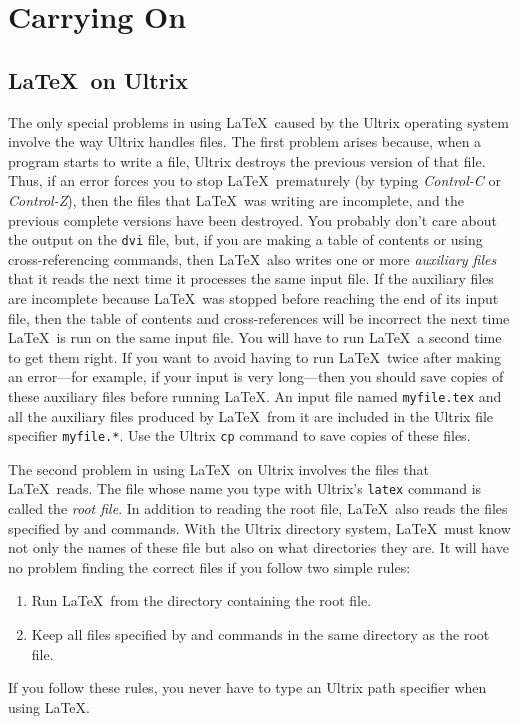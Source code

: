 \section{Carrying On}

\subsection{\LaTeX\ on Ultrix} \label{sec:op-system}

The only special problems in using \LaTeX\ caused by the Ultrix
operating system involve the way Ultrix handles files.  The first
problem arises because, when a program starts to write a file, Ultrix
destroys the previous version of that file.  Thus, if an error forces
you to stop \LaTeX\ prematurely (by typing {\em Control-C\/} or {\em
Control-Z\/}), then the files that \LaTeX\ was writing are incomplete,
and the previous complete versions have been destroyed.  You probably
don't care about the output on the {\tt dvi} file, but, if you are
making a table of contents or using cross-referencing commands, then
\LaTeX\ also writes one or more {\em auxiliary files\/} that it reads
the next time it processes the same input file.  If the auxiliary files
are incomplete because \LaTeX\ was stopped before reaching the end of
its input file, then the table of contents and cross-references will be
incorrect the next time \LaTeX\ is run on the same input file.  You
will have to run \LaTeX\ a second time to get them right.  If you want
to avoid having to run \LaTeX\ twice after making an error---for
example, if your input is very long---then you should save copies of
these auxiliary files before running \LaTeX. An input file named
\mbox{\tt myfile.tex} and all the auxiliary files produced by \LaTeX\
from it are included in the Ultrix file specifier \mbox{\tt myfile.*}.
Use the Ultrix {\tt cp} command to save copies of these files.

The second problem in using \LaTeX\ on Ultrix involves the files that
\LaTeX\ reads.  The file whose name you type with Ultrix's {\tt latex}
command is called the {\em root file}.  In addition to reading the root
file, \LaTeX\ also reads the files specified by \hbox{\verb||}
and \hbox{\verb||} commands.  With the Ultrix directory system,
\LaTeX\ must know not only the names of these file but also on what
directories they are.  It will have no problem finding the correct
files if you follow two simple rules:
\begin{enumerate}
 \item Run \LaTeX\ from the directory containing the root file.
 \item Keep all files specified by \hbox{\verb||} and 
      \hbox{\verb||} commands in the same directory as the root
       file.
\end{enumerate}
If you follow these rules, you never have to type an Ultrix path
specifier when using \LaTeX.


